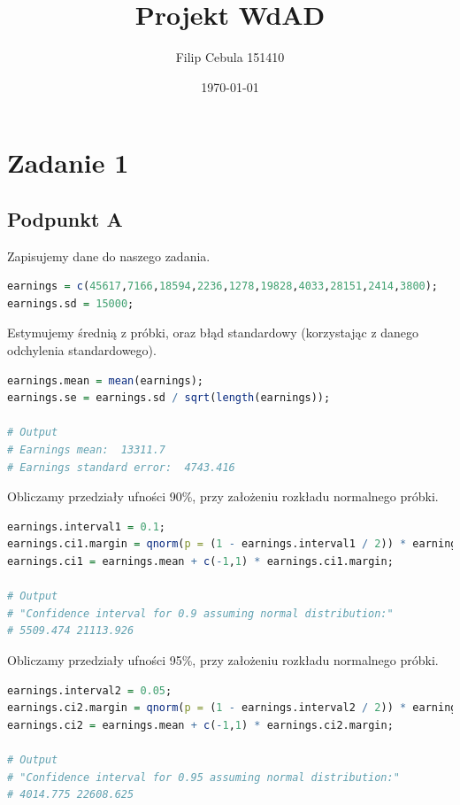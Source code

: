 \documentclass[11pt]{article}
\title{Projekt WdAD}
\author{Filip Cebula 151410}
\date{\today}
\begin{document}
\maketitle
\pagebreak

\section{Zadanie 1}
\subsection{Podpunkt A}
Zapisujemy dane do naszego zadania.

\begin{lstlisting}[language=R]
earnings = c(45617,7166,18594,2236,1278,19828,4033,28151,2414,3800);
earnings.sd = 15000;
\end{lstlisting}

Estymujemy średnią z próbki, oraz błąd standardowy (korzystając z danego odchylenia standardowego).

\begin{lstlisting}[language=R]
earnings.mean = mean(earnings);
earnings.se = earnings.sd / sqrt(length(earnings));

# Output
# Earnings mean:  13311.7 
# Earnings standard error:  4743.416 
\end{lstlisting}

Obliczamy przedziały ufności 90\%, przy założeniu rozkładu normalnego próbki.

\begin{lstlisting}[language=R]
earnings.interval1 = 0.1;
earnings.ci1.margin = qnorm(p = (1 - earnings.interval1 / 2)) * earnings.se;
earnings.ci1 = earnings.mean + c(-1,1) * earnings.ci1.margin;

# Output
# "Confidence interval for 0.9 assuming normal distribution:"
# 5509.474 21113.926
\end{lstlisting}

Obliczamy przedziały ufności 95\%, przy założeniu rozkładu normalnego próbki.

\begin{lstlisting}[language=R]
earnings.interval2 = 0.05;
earnings.ci2.margin = qnorm(p = (1 - earnings.interval2 / 2)) * earnings.se;
earnings.ci2 = earnings.mean + c(-1,1) * earnings.ci2.margin;

# Output
# "Confidence interval for 0.95 assuming normal distribution:"
# 4014.775 22608.625
\end{lstlisting}
\end{document}
